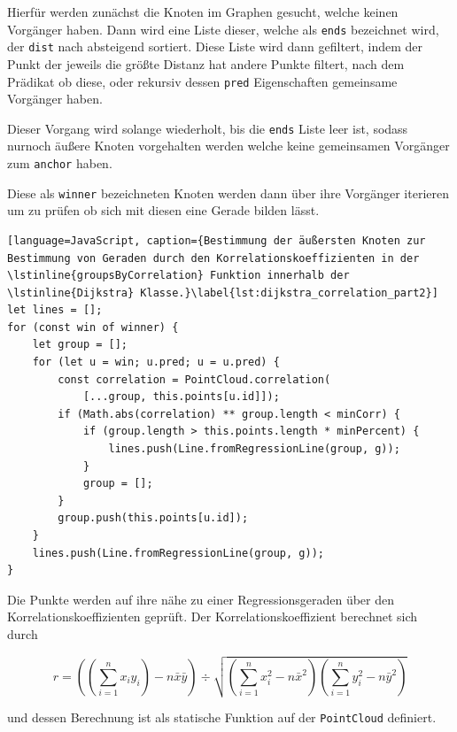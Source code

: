 Hierfür werden zunächst die Knoten im Graphen gesucht, welche keinen Vorgänger haben.
Dann wird eine Liste dieser, welche als \lstinline{ends} bezeichnet wird, der \lstinline{dist} nach absteigend sortiert.
Diese Liste wird dann gefiltert, indem der Punkt der jeweils die größte Distanz hat andere Punkte filtert, nach dem Prädikat ob diese, oder rekursiv dessen \lstinline{pred} Eigenschaften gemeinsame Vorgänger haben.

Dieser Vorgang wird solange wiederholt, bis die \lstinline{ends} Liste leer ist, sodass nurnoch äußere Knoten vorgehalten werden welche keine gemeinsamen Vorgänger zum \lstinline{anchor} haben.

Diese als \lstinline{winner} bezeichneten Knoten werden dann über ihre Vorgänger iterieren um zu prüfen ob sich mit diesen eine Gerade bilden lässt.

\begin{lstlisting}[language=JavaScript, caption={Bestimmung der äußersten Knoten zur Bestimmung von Geraden durch den Korrelationskoeffizienten in der \lstinline{groupsByCorrelation} Funktion innerhalb der \lstinline{Dijkstra} Klasse.}\label{lst:dijkstra_correlation_part2}]
let lines = [];
for (const win of winner) {
    let group = [];
    for (let u = win; u.pred; u = u.pred) {
        const correlation = PointCloud.correlation(
            [...group, this.points[u.id]]);
        if (Math.abs(correlation) ** group.length < minCorr) {
            if (group.length > this.points.length * minPercent) {
                lines.push(Line.fromRegressionLine(group, g));
            }
            group = [];
        }
        group.push(this.points[u.id]);
    }
    lines.push(Line.fromRegressionLine(group, g));
}
\end{lstlisting}

Die Punkte werden auf ihre nähe zu einer Regressionsgeraden über den Korrelationskoeffizienten geprüft.
Der Korrelationskoeffizient berechnet sich durch~\cite{Papula2014}

\begin{equation}
    r = \left(\left(\sum_{i=1}^n x_i y_i\right) - n \bar{x} \bar{y}\right) \div \sqrt{\left(\sum_{i=1}^n x_i^2 - n\bar{x}^2\right)\left(\sum_{i=1}^n y_i^2 - n \bar{y}^2\right)}
    \label{eq:korrelationskoeffizient}
\end{equation}

und dessen Berechnung ist als statische Funktion auf der \lstinline{PointCloud} definiert.

